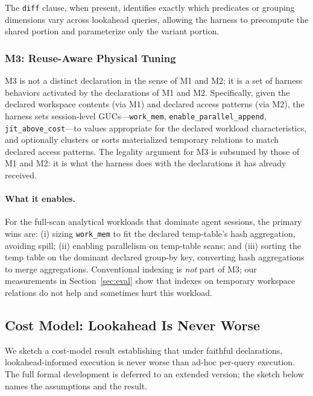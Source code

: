 The \texttt{diff} clause, when present, identifies exactly which predicates or grouping dimensions vary across lookahead queries, allowing the harness to precompute the shared portion and parameterize only the variant portion.

\subsubsection{M3: Reuse-Aware Physical Tuning}
\label{sec:protocol:m3}

M3 is not a distinct declaration in the sense of M1 and M2; it is a set of harness behaviors activated by the declarations of M1 and M2. Specifically, given the declared workspace contents (via M1) and declared access patterns (via M2), the harness sets session-level GUCs---\texttt{work\_mem}, \texttt{enable\_parallel\_append}, \texttt{jit\_above\_cost}---to values appropriate for the declared workload characteristics, and optionally clusters or sorts materialized temporary relations to match declared access patterns. The legality argument for M3 is subsumed by those of M1 and M2: it is what the harness does with the declarations it has already received.

\paragraph{What it enables.}
For the full-scan analytical workloads that dominate agent sessions, the primary wins are: (i) sizing \texttt{work\_mem} to fit the declared temp-table's hash aggregation, avoiding spill; (ii) enabling parallelism on temp-table scans; and (iii) sorting the temp table on the dominant declared group-by key, converting hash aggregations to merge aggregations. Conventional indexing is \emph{not} part of M3; our measurements in Section~\ref{sec:eval} show that indexes on temporary workspace relations do not help and sometimes hurt this workload.

\subsection{Cost Model: Lookahead Is Never Worse}
\label{sec:protocol:costmodel}

We sketch a cost-model result establishing that under faithful declarations, lookahead-informed execution is never worse than ad-hoc per-query execution. The full formal development is deferred to an extended version; the sketch below names the assumptions and the result.

